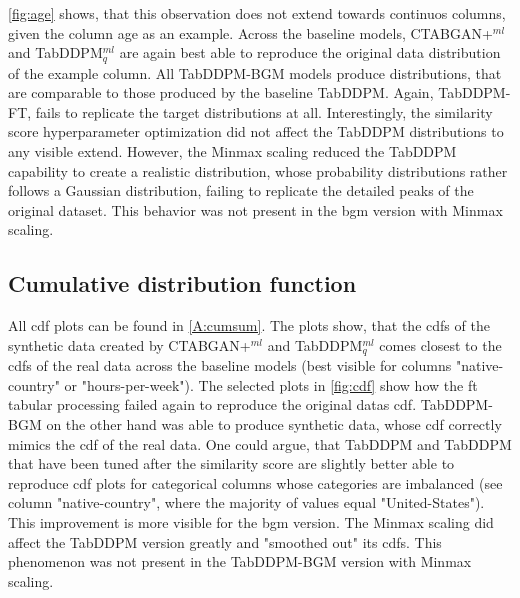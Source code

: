 \autoref{fig:age} shows, that this observation does not extend towards continuos columns, given the column age as an example.
Across the baseline models, CTABGAN+$^{ml}$ and TabDDPM$^{ml}_q$ are again best able to reproduce the original data distribution of the example column.
All TabDDPM-BGM models produce distributions, that are comparable to those produced by the baseline TabDDPM.
Again, TabDDPM-FT, fails to replicate the target distributions at all.
Interestingly, the similarity score hyperparameter optimization did not affect the TabDDPM distributions to any visible extend.
However, the Minmax scaling reduced the TabDDPM capability to create a realistic distribution, whose probability distributions rather follows a Gaussian distribution, failing to replicate the detailed peaks of the original dataset.
This behavior was not present in the \gls{bgm} version with Minmax scaling.


\subsection[]{Cumulative distribution function}

All \gls{cdf} plots can be found in \autoref{A:cumsum}.
The plots show, that the \glspl{cdf} of the synthetic data created by CTABGAN+$^{ml}$ and TabDDPM$^{ml}_q$ comes closest to
the \glspl{cdf} of the real data across the baseline models (best visible for columns "native-country" or "hours-per-week").
The selected plots in \autoref{fig:cdf} show how the \gls{ft} tabular processing failed again to reproduce the original datas \gls{cdf}.
TabDDPM-BGM on the other hand was able to produce synthetic data, whose \gls{cdf} correctly mimics the \gls{cdf} of the real data.
One could argue, that TabDDPM and TabDDPM that have been tuned after the similarity score are slightly better able to
reproduce \gls{cdf} plots for categorical columns whose categories are imbalanced (\eg see column "native-country", where the majority of values equal "United-States").
This improvement is more visible for the \gls{bgm} version.
The Minmax scaling did affect the TabDDPM version greatly and "smoothed out" its \glspl{cdf}.
This phenomenon was not present in the TabDDPM-BGM version with Minmax scaling.


